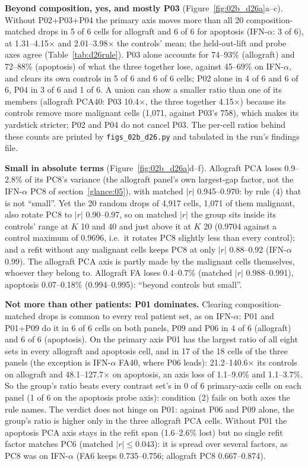 \textbf{Beyond composition, yes, and mostly P03} (Figure~\ref{fig:02b_d26a}a--c). Without P02+P03+P04 the primary axis moves more than all 20 composition-matched drops in 5 of 6 cells for allograft and 6 of 6 for apoptosis (IFN-$\alpha$: 3 of 6), at 1.31--4.15$\times$ and 2.01--3.98$\times$ the controls' mean; the held-out-lift and probe axes agree (Table~\ref{tab:d26rule}). P03 alone accounts for 74--93\% (allograft) and 72--88\% (apoptosis) of what the three together lose, against 45--69\% on IFN-$\alpha$, and clears its own controls in 5 of 6 and 6 of 6 cells; P02 alone in 4 of 6 and 6 of 6, P04 in 3 of 6 and 1 of 6. A union can show a smaller ratio than one of its members (allograft PCA40: P03 10.4$\times$, the three together 4.15$\times$) because its controls remove more malignant cells (1,071, against P03's 758), which makes its yardstick stricter; P02 and P04 do not cancel P03. The per-cell ratios behind these counts are printed by \texttt{figs\_02b\_d26.py} and tabulated in the run's findings file.

\textbf{Small in absolute terms} (Figure~\ref{fig:02b_d26a}d--f). Allograft PCA loses 0.9--2.8\% of its PC8's variance (the allograft panel's own largest-gap factor, not the IFN-$\alpha$ PC8 of section~\ref{glance:05}), with matched $|r|$ 0.945--0.970: by rule (4) that is not ``small''. Yet the 20 random drops of 4,917 cells, 1,071 of them malignant, also rotate PC8 to $|r|$ 0.90--0.97, so on matched $|r|$ the group sits inside its controls' range at $K$ 10 and 40 and just above it at $K$ 20 (0.9704 against a control maximum of 0.9696, i.e.\ it rotates PC8 slightly less than every control); and a refit without any malignant cells keeps PC8 at only $|r|$ 0.88--0.92 (IFN-$\alpha$ 0.99). The allograft PCA axis is partly made by the malignant cells themselves, whoever they belong to. Allograft FA loses 0.4--0.7\% (matched $|r|$ 0.988--0.991), apoptosis 0.07--0.18\% (0.994--0.995): ``beyond controls but small''.

\textbf{Not more than other patients: P01 dominates.} Clearing composition-matched drops is common to every real patient set, as on IFN-$\alpha$: P01 and P01+P09 do it in 6 of 6 cells on both panels, P09 and P06 in 4 of 6 (allograft) and 6 of 6 (apoptosis). On the primary axis P01 has the largest ratio of all eight sets in every allograft and apoptosis cell, and in 17 of the 18 cells of the three panels (the exception is IFN-$\alpha$ FA40, where P06 leads): 21.2--140.6$\times$ its controls on allograft and 48.1--127.7$\times$ on apoptosis, an axis loss of 1.1--9.0\% and 1.1--3.7\%. So the group's ratio beats every contrast set's in 0 of 6 primary-axis cells on each panel (1 of 6 on the apoptosis probe axis): condition (2) fails on both axes the rule names. The verdict does not hinge on P01: against P06 and P09 alone, the group's ratio is higher only in the three allograft PCA cells. Without P01 the apoptosis PCA axis stays in the refit span (1.6--2.6\% lost) but no single refit factor matches PC6 (matched $|r| \leq 0.043$): it is spread over several factors, as PC8 was on IFN-$\alpha$ (FA6 keeps 0.735--0.756; allograft PC8 0.667--0.874).

